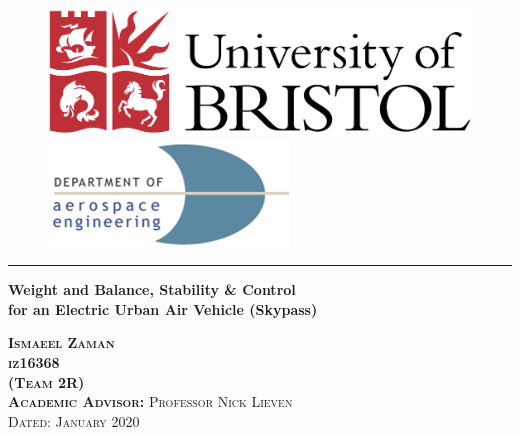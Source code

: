 \documentclass[11pt,a4paper]{article}
\begin{document}
\begin{titlepage}

\begin{figure}[H]
  \includegraphics[width=.75\linewidth]{University_of_Bristol_logo.png}
  \endminipage\hfill
  \centering
    \endminipage\hfill
    \hspace{12mm}
      \includegraphics[width=.75\linewidth]{Aero_logo.png}
      \endminipage
      \end{figure}

\center 
\vspace{20mm}
\hrule

{\Large  \textbf{Weight and Balance, Stability \& Control \\ \vspace{2mm}
for an Electric Urban Air Vehicle (Skypass)}}
\vspace{10mm}

\textsc{\textbf{Ismaeel Zaman}} \\
\textsc{\textbf{iz16368}} \\
\textsc{\textbf{(Team 2R)}}\\
\vspace{10mm}
\textsc{\textbf{Academic Advisor:} Professor Nick Lieven} 
\\[0.5cm]

\vspace{24pt}
\textsc{\large Dated: January 2020} 
\vspace{6pt}


\end{titlepage}
\end{document}
